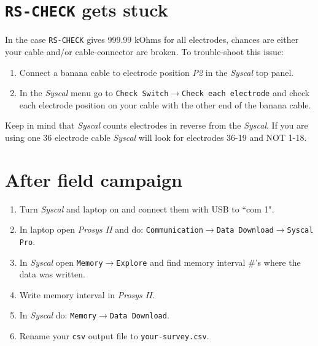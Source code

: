 \documentclass[a4paper,12pt]{article}
\begin{document}
\section*{\texttt{RS-CHECK} gets stuck}
In the case \texttt{RS-CHECK} gives 999.99 kOhms for all electrodes, chances are either your cable and/or cable-connector are broken. To trouble-shoot this issue:
\begin{enumerate}
\item Connect a banana cable to electrode position {\it P2} in the {\it Syscal} top panel.
\item In the {\it Syscal} menu go to \texttt{Check Switch$\to$Check each electrode} and check each electrode position on your cable with the other end of the banana cable.
\end{enumerate}
Keep in mind that {\it Syscal} counts electrodes in reverse from the {\it Syscal}. If you are using one 36 electrode cable {\it Syscal} will look for electrodes 36-19 and NOT 1-18.
\clearpage
\section*{After field campaign}
\begin{enumerate}
\item Turn {\it Syscal} and laptop on and connect them with USB to ``com 1".
\item In laptop open {\it Prosys II} and do: \texttt{Communication$\to$Data Download$\to$Syscal Pro}.
\item In {\it Syscal} open \texttt{Memory$\to$Explore} and find memory interval \#'s where the data was written.
\item Write memory interval in {\it Prosys II}.
\item In {\it Syscal} do: \texttt{Memory$\to$Data Download}.
\item Rename your \texttt{csv} output file to \texttt{your-survey.csv}.
\end{enumerate}
\end{document}
